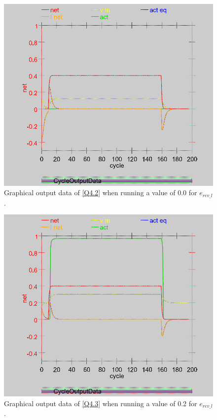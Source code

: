 \begin{multicols}{2}
\begin{figure}[H]
\centering
\includegraphics[scale=0.3]{Media/Main/EQ1/2.4.S1G.png}
\caption{Graphical output data of \cref{Q4.2} when running a value of 0.0 for $e_{rev\_l}$.}
\label{Q4.5}
\end{figure}

\begin{figure}[H]
\centering
\includegraphics[scale=0.3]{Media/Main/EQ1/2.4.S2G.png}
\caption{Graphical output data of \cref{Q4.3} when running a value of 0.2 for $e_{rev\_l}$.}
\label{Q4.6}
\end{figure}
\end{multicols}

